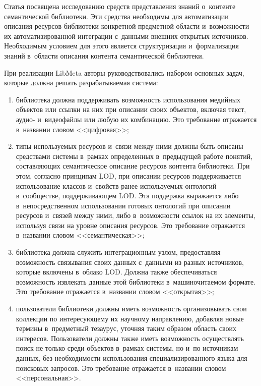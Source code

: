 \begin{multicols}{2}
     Статья посвящена исследованию средств пред\-став\-ле\-ния знаний 
о~контенте семантической биб\-лио\-те\-ки. Эти средства необходимы для 
автоматизации описания ресурсов биб\-лио\-те\-ки конкретной предметной 
области и~воз\-мож\-ности их автоматизированной интеграции с~данными 
внеш\-них открытых источников. Необходимым условием для этого является 
структуризация и~формализация знаний в~об\-ласти описания контента 
семантической биб\-лио\-теки. 
     
     При реализации LibMeta авторы руководствовались набором основных 
задач, которые должна решать разрабатываемая система:
     \begin{enumerate}[(1)]
\item библиотека должна поддерживать возможность использования 
медийных объектов или ссылки на них при описании своих объектов, 
включая текст, аудио- и~видеофайлы или любую их комбинацию. Это 
требование отражается в~названии словом <<цифровая>>;\\[-10pt]
\item типы используемых ресурсов и~связи между ними должны быть 
описаны средствами сис\-те\-мы в~рамках определенных в~предыду\-щей работе 
понятий, составляющих семантическое описание ресурсов контента 
биб\-лио\-те\-ки. При этом, согласно принципам LOD, при описании ресурсов 
поддерживается использование классов и~свойств ранее используемых 
онтологий в~сообществе, поддерживающем LOD. Эта поддержка 
выражается либо в~непосредственном использовании готовых онтологий 
при описании ресурсов и~связей между ними, либо в~возможности ссылок 
на их элементы, используя связи на уровне описания ресурсов. Это 
требование отражается в~названии словом <<семантическая>>;\\[-10pt]
\item библиотека должна служить интеграционным узлом, предоставляя 
возможность связывания своих данных с~данными из разных источников, 
которые включены в~облако LOD. Должна также обеспечиваться 
возможность извлекать данные этой биб\-лио\-те\-ки в~машиночитаемом 
формате. Это требование отражается в~на\-зва\-нии словом <<открытая>>;\\[-10pt]
\item пользователи биб\-лио\-те\-ки должны иметь возможность организовывать 
свои коллекции по интересующему их научному на\-прав\-ле\-нию, добавляя 
новые термины в~предметный тезаурус, уточняя таким образом об\-ласть 
своих интересов. Пользователи должны также иметь возможность 
осуществлять поиск не только среди объектов в~рамках сис\-те\-мы, но и~по 
источникам данных, без необходимости использования 
специализированного языка для поисковых запросов. Это требование 
отражается в~названии словом <<персональная>>.
\end{enumerate}


\end{multicols}
